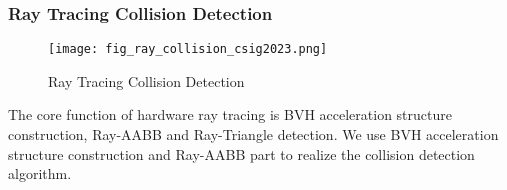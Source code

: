 \begin{frame}
    \frametitle{Ray Tracing Collision Detection}
    \begin{figure}[H]
        \centering
        \texttt{[image: fig\_ray\_collision\_csig2023.png]}
        \caption{Ray Tracing Collision Detection}
    \end{figure}
    The core function of hardware ray tracing is BVH acceleration structure construction, Ray-AABB and Ray-Triangle detection. We use BVH acceleration structure construction and Ray-AABB part to realize the collision detection algorithm. \cite{rtCollision2022}
\end{frame}

